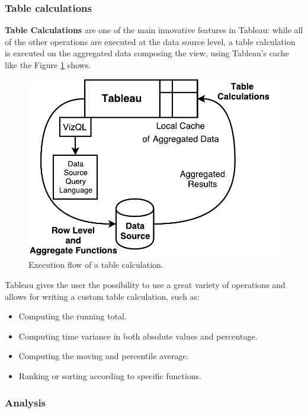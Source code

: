 \subsubsection{Table calculations}

\textbf{Table Calculations} are one of the main innovative features in Tableau: while all of the other operations are executed at the data source level, a table calculation is executed on the aggregated data composing the view, using Tableau's cache like the Figure \ref{fig:TableCalculation} shows.


\begin{figure}[ht]
    \begin{center}
        \includegraphics[width=0.8\linewidth]{Figures/TableCalculation}
    \end{center}
    \caption{Execution flow of a table calculation.}
    \label{fig:TableCalculation}
\end{figure}

Tableau gives the user the possibility to use a great variety of operations and allows for writing a custom table calculation, such as:

\begin{itemize}
    \item Computing the running total.
    \item Computing time variance in both absolute values and percentage.
    \item Computing the moving and percentile average.
    \item Ranking or sorting according to specific functions.
\end{itemize}

\subsubsection{Analysis}

